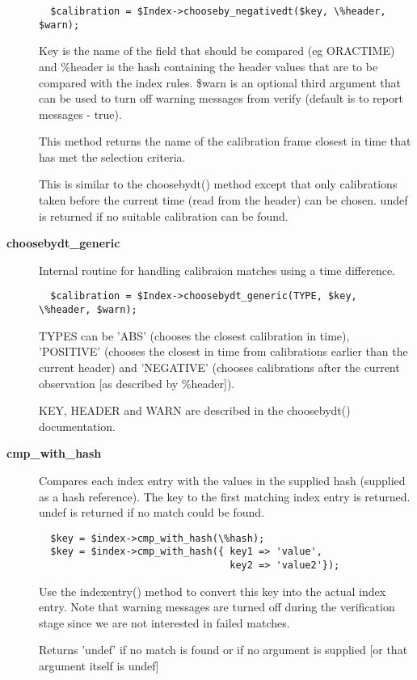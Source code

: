 \begin{description}
\begin{verbatim}
  $calibration = $Index->chooseby_negativedt($key, \%header, $warn);
\end{verbatim}


Key is the name of the field that should be compared (eg ORACTIME)
and \%header is the hash containing the header values that are to
be compared with the index rules. \$warn is an optional third argument
that can be used to turn off warning messages from verify (default
is to report messages - true).



This method returns the name of the calibration frame closest in 
time that has met the selection criteria.



This is similar to the choosebydt() method except that only
calibrations taken before the current time (read from the
header) can be chosen. undef is returned if no suitable 
calibration can be found.

\item[\textbf{choosebydt\_generic}] \mbox{}

Internal routine for handling calibraion matches using a 
time difference.

\begin{verbatim}
  $calibration = $Index->choosebydt_generic(TYPE, $key, \%header, $warn);
\end{verbatim}


TYPES can be 'ABS' (chooses the closest calibration in time), 
'POSITIVE' (chooses the closest in time from calibrations earlier
than the current header) and 'NEGATIVE' (chooses calibrations after
the current observation [as described by \%header]).



KEY, HEADER and WARN are described in the choosebydt() documentation.

\item[\textbf{cmp\_with\_hash}] \mbox{}

Compares each index entry with the values in the supplied hash
(supplied as a hash reference). The key to the first matching 
index entry is returned. undef is returned if no match could be 
found.

\begin{verbatim}
  $key = $index->cmp_with_hash(\%hash);
  $key = $index->cmp_with_hash({ key1 => 'value',
                                 key2 => 'value2'});
\end{verbatim}


Use the indexentry() method to convert this key into the actual
index entry. Note that warning messages are turned off during the
verification stage since we are not interested in failed matches.



Returns 'undef' if no match is found or if no argument is supplied
[or that argument itself is undef]

\end{description}
